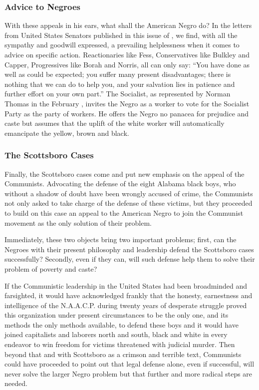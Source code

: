 \documentclass[letterpaper,10pt,english]{jupyterBook}
\begin{document}
\subsubsection{Advice to Negroes}
\label{\detokenize{Volumes/38/09/negro_and_communism:advice-to-negroes}}
\sphinxAtStartPar
With these appeals in his ears, what shall the American Negro do? In the letters from United States Senators published in this issue of , we find, with all the sympathy and good\sphinxhyphen{}will expressed, a prevailing helplessness when it comes to advice on specific action. Reactionaries like Fess, Conservatives like Bulkley and Capper, Progressives like Borah and Norris, all can only say: “You have done as well as could be expected; you suffer many present disadvantages; there is nothing that we can do to help you, and your salvation lies in patience and further effort on your own part.” The Socialist, as represented by Norman Thomas in the February , invites the Negro as a worker to vote for the Socialist Party as the party of workers. He offers the Negro no panacea for prejudice and caste but assumes that the uplift of the white worker will automatically emancipate the yellow, brown and black.


\subsubsection{The Scottsboro Cases}
\label{\detokenize{Volumes/38/09/negro_and_communism:the-scottsboro-cases}}
\sphinxAtStartPar
Finally, the Scottsboro cases come and put new emphasis on the appeal of the Communists. Advocating the defense of the eight Alabama black boys, who without a shadow of doubt have been wrongly accused of crime, the Communists not only asked to take charge of the defense of these victims, but they proceeded to build on this case an appeal to the American Negro to join the Communist movement as the only solution of their problem.

\sphinxAtStartPar
Immediately, these two objects bring two important problems; first, can the Negroes with their present philosophy and leadership defend the Scottsboro cases successfully? Secondly, even if they can, will such defense help them to solve their problem of poverty and caste?

\sphinxAtStartPar
If the Communistic leadership in the United States had been broadminded and far\sphinxhyphen{}sighted, it would have acknowledged frankly that the honesty, earnestness and intelligence of the N.A.A.C.P. during twenty years of desperate struggle proved this organization under present circumstances to be the only one, and its methods the only methods available, to defend these boys and it would have joined capitalists and laborers north and south, black and white in every endeavor to win freedom for victims threatened with judicial murder. Then beyond that and with Scottsboro as a crimson and terrible text, Communists could have proceeded to point out that legal defense alone, even if successful, will never solve the larger Negro problem but that further and more radical steps are needed.
\end{document}
